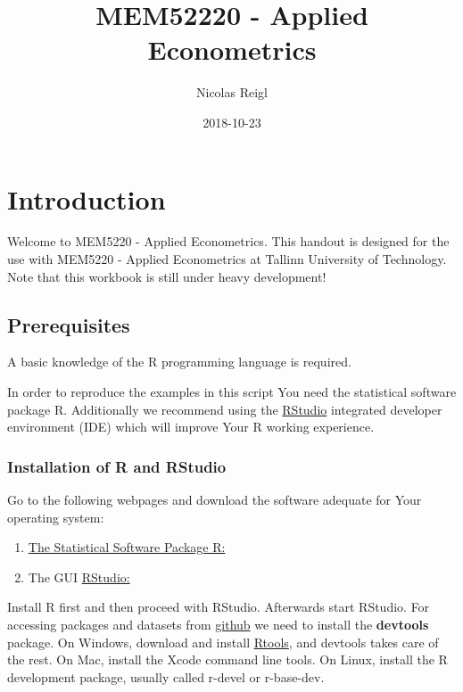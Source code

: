 \documentclass[]{book}
\title{MEM52220 - Applied Econometrics}
\author{Nicolas Reigl}
\date{2018-10-23}
\providecommand{\tightlist}{%
  \setlength{\itemsep}{0pt}\setlength{\parskip}{0pt}}
\begin{document}
\maketitle

{
\setcounter{tocdepth}{1}
\tableofcontents
}
\hypertarget{introduction}{%
\chapter*{Introduction}\label{introduction}}

Welcome to MEM5220 - Applied Econometrics. This handout is designed for
the use with MEM5220 - Applied Econometrics at Tallinn University of
Technology. Note that this workbook is still under heavy development!

\hypertarget{prerequisites}{%
\section*{Prerequisites}\label{prerequisites}}

A basic knowledge of the R \citep{team2013r} programming language is
required.

In order to reproduce the examples in this script You need the
statistical software package R. Additionally we recommend using the
\href{https://www.rstudio.com}{RStudio} integrated developer environment
(IDE) which will improve Your R working experience.

\hypertarget{installation-of-r-and-rstudio}{%
\subsection*{Installation of R and
RStudio}\label{installation-of-r-and-rstudio}}

Go to the following webpages and download the software adequate for Your
operating system:

\begin{enumerate}
\def\labelenumi{\arabic{enumi}.}
\tightlist
\item
  \href{http://cran.r-project.org}{The Statistical Software Package R:}
\item
  The GUI \href{https://www.rstudio.com}{RStudio:}
\end{enumerate}

Install R first and then proceed with RStudio. Afterwards start RStudio.
For accessing packages and datasets from
\href{https://github.com/}{github} we need to install the
\textbf{devtools} package. On Windows, download and install
\href{https://cran.r-project.org/bin/windows/Rtools/}{Rtools}, and
devtools takes care of the rest. On Mac, install the Xcode command line
tools. On Linux, install the R development package, usually called
r-devel or r-base-dev.
\end{document}
